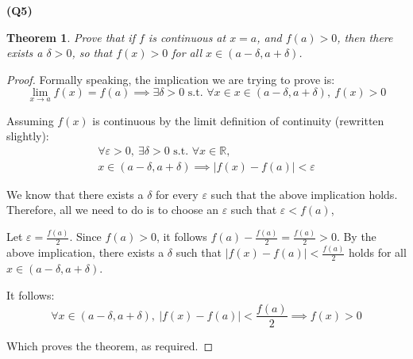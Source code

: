 \documentclass[12pt, a4paper]{article}
\renewcommand{\epsilon}{\varepsilon}
\newcommand{\displim}[1]{\displaystyle{\lim_{#1}}}
\newcommand{\st}{\text{ s.t. }}
\newcommand{\R}{\mathbb{R}}
\newtheorem{theorem}{Theorem}
\begin{document}
\textbf{(Q5)}

\begin{theorem}
    Prove that if $f$ is continuous at $x = a$, and $f(a) > 0$, then there exists
    a $\delta > 0$, so that $f(x) > 0$ for all $x \in (a - \delta, a + \delta)$.
\end{theorem}

\begin{proof}
    Formally speaking, the implication we are trying to prove is:
    \[
        \displim{x \to a} f(x) = f(a) \implies \exists \delta > 0 \st \forall x \in
        x \in (a - \delta, a + \delta), \: f(x) > 0
    \]

    Assuming $f(x)$ is continuous by the limit definition of continuity (rewritten slightly):
    \begin{gather*}
        \forall \epsilon > 0, \: \exists \delta > 0 \st \forall x \in \R,\\
        x \in (a - \delta, a + \delta) \implies |f(x) - f(a)| < \epsilon
    \end{gather*}

    We know that there exists a $\delta$ for every $\epsilon$ such that the above implication
    holds. Therefore, all we need to do is to choose an $\epsilon$ such that $\epsilon < f(a)$,

    Let $\epsilon = \frac{f(a)}{2}$. Since $f(a) > 0$, it follows
    $f(a) - \frac{f(a)}{2} = \frac{f(a)}{2} > 0$. By the above implication, there exists
    a $\delta$ such that $|f(x) - f(a)| < \frac{f(a)}{2}$ holds for all $x \in (a - \delta, a + \delta)$.

    It follows:
    \[
        \forall x \in (a - \delta, a + \delta), \:|f(x) - f(a)| < \frac{f(a)}{2} \implies f(x) > 0
    \]

    Which proves the theorem, as required.
\end{proof}
\end{document}
